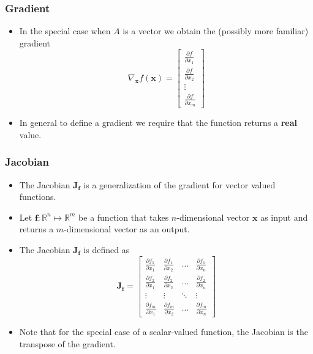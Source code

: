 \documentclass[notes]{beamer}          %
\newcommand{\vect}[1]{\bm{#1}}
\newcommand{\field}[1]{\mathbb{#1}}
\newcommand{\R}{\field{R}}
\begin{document}
\begin{frame}
\frametitle{Gradient}
    \begin{itemize}
        \item In the special case when $A$ is a vector we obtain the (possibly more familiar) gradient
        $$ \nabla_{\vect{x}} f(\vect{x}) =
        \begin{bmatrix}
         \frac{\partial f}{\partial x_{1}}  \\
          \frac{\partial f}{\partial x_{2}}  \\
          \vdots  \\
           \frac{\partial f}{\partial x_{m}}
        \end{bmatrix}$$
        \item In general to define a gradient we require that the function returns a {\bf real} value.
    \end{itemize}

\end{frame}

\begin{frame}
\frametitle{Jacobian}

\begin{itemize}
    \item The Jacobian $\vect{J_f}$ is a generalization of the gradient for vector valued functions.
    \item Let $\vect{f}:\R^n \mapsto \R^m $ be a function that takes $n$-dimensional vector $\vect{x}$ as input and returns a $m$-dimensional vector as an output.
    \item The Jacobian $\vect{J_f}$ is defined as
    $$
        \vect{J_f} =
        \begin{bmatrix}
         \frac{\partial f_1}{\partial x_{1}} & \frac{\partial f_1}{\partial x_{2}} & \ldots & \frac{\partial f_1}{\partial x_{n}} \\
          \frac{\partial f_2}{\partial x_{1}} & \frac{\partial f_2}{\partial x_{2}} & \ldots & \frac{\partial f_2}{\partial x_{n}} \\
          \vdots & \vdots & \ddots & \vdots \\
           \frac{\partial f_m}{\partial x_{1}} & \frac{\partial f_m}{\partial x_{2}} & \ldots & \frac{\partial f_m}{\partial x_{n}}
        \end{bmatrix}
    $$
    \item Note that for the special case of a scalar-valued function, the Jacobian is the transpose of the gradient.
\end{itemize}

\end{frame}
\end{document}
